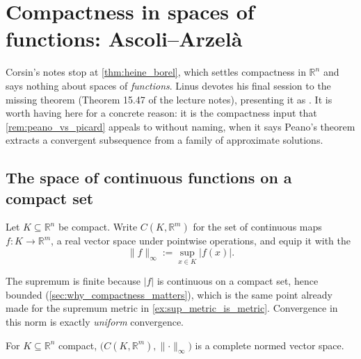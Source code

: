 
\section{Compactness in spaces of functions: Ascoli--Arzelà}
\label{sec:ascoli_arzela}

\begin{ainote}
Corsin's notes stop at \cref{thm:heine_borel}, which settles compactness in $\mathbb{R}^n$ and
says nothing about spaces of \emph{functions}. Linus devotes his final session to the missing
theorem (Theorem 15.47 of the lecture notes), presenting it as . It is worth having here for a concrete reason: it is the compactness
input that \cref{rem:peano_vs_picard} appeals to without naming, when it says Peano's theorem
extracts a convergent subsequence from a family of approximate solutions.
\end{ainote}

\subsection{The space of continuous functions on a compact set}

\begin{definition}
\label{def:sup_norm_function_space}
Let $K \subseteq \mathbb{R}^n$ be compact. Write $C(K,\mathbb{R}^m)$ for the set of continuous
maps $f : K \to \mathbb{R}^m$, a real vector space under pointwise operations, and equip it with
the  
\[\lVert f\rVert_\infty := \sup_{x \in K} \lvert f(x)\rvert.\]
\end{definition}

The supremum is finite because $\lvert f\rvert$ is continuous on a compact set, hence bounded
(\cref{sec:why_compactness_matters}), which is the same point already made for the supremum metric
in \cref{ex:sup_metric_is_metric}. Convergence in this norm is exactly \emph{uniform} convergence.

\begin{proposition}
\label{prop:function_space_complete}
For $K \subseteq \mathbb{R}^n$ compact, $\big(C(K,\mathbb{R}^m), \lVert\cdot\rVert_\infty\big)$
is a complete normed vector space.
\end{proposition}

